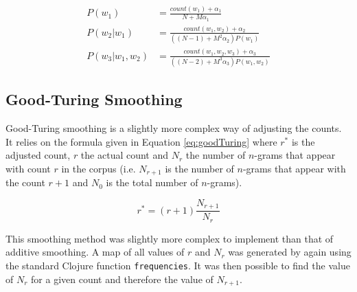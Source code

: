 \begin{subequations}
\begin{align}
P(w_{1})&=\frac{count(w_{1})+\alpha_{1}}{N+M\alpha_{1}} \label{eq:1-gramAdditiveSmoothing}
\\
P(w_{2}| w_{1})&=\frac{count(w_{1}, w_{2})+\alpha_{2}}{((N-1)+M^{2}\alpha_{2})P(w_{1})} \label{eq:2-gramAdditiveSmoothing}
\\
P(w_{3}| w_{1}, w_{2}) &= \frac{count(w_{1}, w_{2}, w_{3})+\alpha_{3}}{((N-2)+M^{3}\alpha_{3})P(w_{1}, w_{2})} \label{eq:3-gramAdditiveSmoothing}
\end{align}
\end{subequations}

%
%

\subsection{Good-Turing Smoothing} \label{sec:goodTuringSmoothing}

Good-Turing smoothing is a slightly more complex way of adjusting the counts. It relies on the formula given in Equation \ref{eq:goodTuring} where $r^{*}$ is the adjusted count, $r$ the actual count and $N_{r}$ the number of $n$-grams that appear with count $r$ in the corpus (i.e. $N_{r+1}$ is the number of $n$-grams that appear with the count $r+1$ and $N_{0}$ is the total number of $n$-grams).

\begin{equation}
r^{*}=(r+1)\frac{N_{r+1}}{N_{r}}
\label{eq:goodTuring}
\end{equation}


This smoothing method was slightly more complex to implement than that of additive smoothing. A map of all values of $r$ and $N_{r}$ was generated by again using the standard Clojure function \lstinline!frequencies!. It was then possible to find the value of $N_{r}$ for a given count and therefore the value of $N_{r+1}$. 


